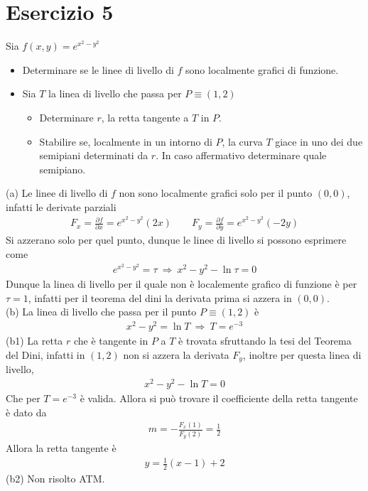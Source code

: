 \documentclass[a4paper, oneside]{book}
\begin{document}
\section{Esercizio 5}
Sia $f(x,y)=e^{x^{2}-y^{2}}$
\begin{itemize}
    \item[(a)] Determinare se le linee di livello di $f$ sono localmente grafici di funzione.
    \item[(b)] Sia $T$ la linea di livello che passa per $P\equiv(1,2)$ 
    \begin{itemize}
        \item[(b1)] Determinare $r$, la retta tangente a $T$ in $P$. 
        \item[(b2)] Stabilire se, localmente in un intorno di $P$, la curva $T$ giace in uno dei due semipiani determinati da $r$. In caso affermativo determinare quale semipiano. 
    \end{itemize}
\end{itemize} \noindent 
(a) Le linee di livello di $f$ non sono localmente grafici 
solo per il punto $(0, 0)$, infatti le derivate parziali
\begin{gather*}
    F_x = \frac{\partial f}{\partial x} = e^{x^{2} - y^{2}} (2x) \qquad F_y = \frac{\partial f}{\partial y} = e^{x^{2} - y^{2}} (-2y)  
\end{gather*}
Si azzerano solo per quel punto, dunque le linee di livello si possono
esprimere come 
\begin{gather*}
    e^{x^{2} - y^{2}}  =\tau \ \Longrightarrow \ x^{2} -y^{2} - \ln \tau = 0
\end{gather*}
Dunque la linea di livello per il quale non è localemente grafico di funzione è 
per $\tau = 1$, infatti per il teorema del dini la derivata prima si azzera in $(0, 0)$. \\
(b) La linea di livello che passa per il punto $P \equiv (1, 2)$ è 
\begin{gather*}
    x^{2} - y^{2} = \ln T \ \Longrightarrow \ T = e^{-3}
\end{gather*}
(b1) La retta $r$ che è tangente in $P$ a $T$ è trovata sfruttando la tesi del Teorema del Dini,
infatti in $(1, 2)$ non si azzera la derivata $F_y$, inoltre per questa linea di livello, 
\begin{gather*}
    x^{2} - y^{2} - \ln T = 0 
\end{gather*}
Che per $T = e^{-3}$ è valida. Allora si può trovare il coefficiente della retta tangente 
è dato da
\begin{gather*}
    m = - \frac{F_x(1)}{F_y(2)} = \frac{1}{2}
\end{gather*}
Allora la retta tangente è
\begin{gather*}
    y = \frac{1}{2}(x - 1) + 2 
\end{gather*}
(b2) Non risolto ATM.
\end{document}
